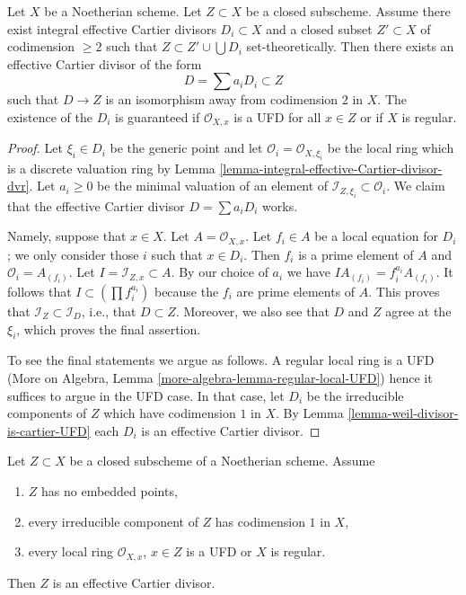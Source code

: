 \begin{lemma}
\label{lemma-codim-1-part}
Let $X$ be a Noetherian scheme. Let $Z \subset X$ be a closed subscheme.
Assume there exist integral effective Cartier divisors $D_i \subset X$
and a closed subset $Z' \subset X$ of codimension $\geq 2$ such that
$Z \subset Z' \cup \bigcup D_i$ set-theoretically.
Then there exists an effective Cartier divisor of the form
$$
D = \sum a_i D_i \subset Z
$$
such that $D \to Z$ is an isomorphism away from codimension $2$ in $X$.
The existence of the $D_i$ is guaranteed if $\mathcal{O}_{X, x}$
is a UFD for all $x \in Z$ or if $X$ is regular.
\end{lemma}

\begin{proof}
Let $\xi_i \in D_i$ be the generic point and let
$\mathcal{O}_i = \mathcal{O}_{X, \xi_i}$ be the local ring
which is a discrete valuation ring by
Lemma \ref{lemma-integral-effective-Cartier-divisor-dvr}.
Let $a_i \geq 0$ be the minimal valuation of an element of
$\mathcal{I}_{Z, \xi_i} \subset \mathcal{O}_i$.
We claim that the effective Cartier divisor $D = \sum a_i D_i$ works.

\medskip\noindent
Namely, suppose that $x \in X$. Let $A = \mathcal{O}_{X, x}$.
Let $f_i \in A$ be a local equation for $D_i$;
we only consider those $i$ such that $x \in D_i$. Then $f_i$ is
a prime element of $A$ and $\mathcal{O}_i = A_{(f_i)}$. Let
$I = \mathcal{I}_{Z, x} \subset A$. By our choice of $a_i$ we have
$I A_{(f_i)} = f_i^{a_i}A_{(f_i)}$. It follows that
$I \subset (\prod f_i^{a_i})$ because the $f_i$ are prime elements of $A$.
This proves that $\mathcal{I}_Z \subset \mathcal{I}_D$, i.e., that
$D \subset Z$. Moreover, we also see that $D$ and $Z$ agree at the $\xi_i$,
which proves the final assertion.

\medskip\noindent
To see the final statements we argue as follows. A regular local
ring is a UFD (More on Algebra, Lemma
\ref{more-algebra-lemma-regular-local-UFD}) hence it suffices
to argue in the UFD case. In that case, let
$D_i$ be the irreducible components of $Z$
which have codimension $1$ in $X$.
By Lemma \ref{lemma-weil-divisor-is-cartier-UFD} each $D_i$
is an effective Cartier divisor.
\end{proof}

\begin{lemma}
\label{lemma-codimension-1-is-effective-Cartier}
Let $Z \subset X$ be a closed subscheme of a Noetherian scheme. Assume
\begin{enumerate}
\item $Z$ has no embedded points,
\item every irreducible component of $Z$ has codimension $1$ in $X$,
\item every local ring $\mathcal{O}_{X, x}$, $x \in Z$ is
a UFD or $X$ is regular.
\end{enumerate}
Then $Z$ is an effective Cartier divisor.
\end{lemma}

